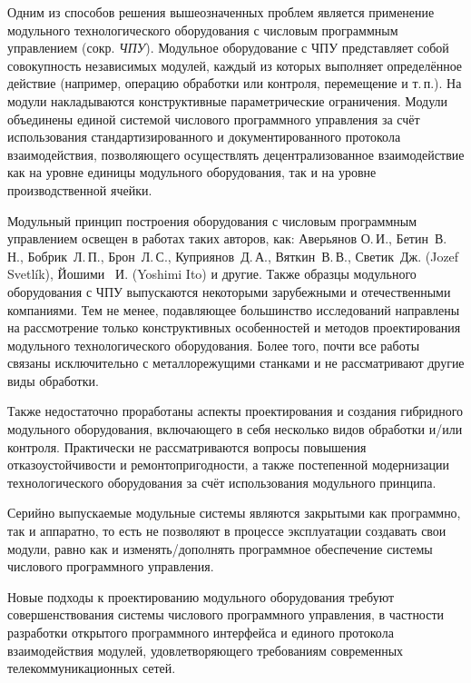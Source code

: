 Одним из способов решения вышеозначенных проблем является применение модульного технологического оборудования с числовым программным управлением (сокр. \textit{ЧПУ}). Модульное оборудование с ЧПУ представляет собой совокупность независимых модулей, каждый из которых выполняет определённое действие (например, операцию обработки или контроля, перемещение и т.\,п.). На модули накладываются конструктивные параметрические ограничения. Модули объединены единой системой числового программного управления за счёт использования стандартизированного и документированного протокола взаимодействия, позволяющего осуществлять децентрализованное взаимодействие как на уровне единицы модульного оборудования, так и на уровне производственной ячейки. 

Модульный принцип построения оборудования с числовым программным управлением освещен в работах таких авторов, как: Аверьянов О.\,И., Бетин~В.\,Н., Бобрик~Л.\,П., Брон~Л.\,С., Куприянов~Д.\,А., Вяткин~В.\,В., Светик~Дж. (Jozef Svetl\'ik), Йошими ~И. (Yoshimi Ito) и другие. Также образцы модульного оборудования с ЧПУ выпускаются некоторыми зарубежными и отечественными компаниями. Тем не менее, подавляющее большинство исследований направлены на рассмотрение только конструктивных особенностей и методов проектирования модульного технологического оборудования. Более того, почти все работы связаны исключительно с металлорежущими станками и не рассматривают другие виды обработки.

Также недостаточно проработаны аспекты проектирования и создания гибридного модульного оборудования, включающего в себя несколько видов обработки и/или контроля. Практически не рассматриваются вопросы повышения отказоустойчивости и ремонтопригодности, а также постепенной модернизации технологического оборудования за счёт использования модульного принципа.

Серийно выпускаемые модульные системы являются закрытыми как программно, так и аппаратно, то есть не позволяют в процессе эксплуатации создавать свои модули, равно как и изменять/дополнять программное обеспечение системы числового программного управления. 

Новые подходы к проектированию модульного оборудования требуют совершенствования системы числового программного управления, в частности разработки открытого программного интерфейса и единого протокола взаимодействия модулей, удовлетворяющего требованиям современных телекоммуникационных сетей.

